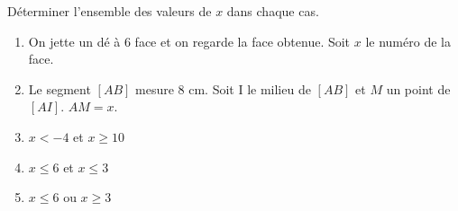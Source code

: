 
Déterminer l'ensemble des valeurs de $x$ dans chaque cas.
\begin{enumerate}
\item On jette un dé à 6 face et on regarde la face obtenue. Soit $x$ le numéro de la face. 
\item Le segment $[AB]$ mesure 8 cm. Soit I le milieu de $[AB]$ et $M$ un point de $[AI]$. $AM = x$. 
\item $x < -4$ et $x \geq 10$
\item $x \leq 6$ et $x \leq 3$
\item $x \leq 6$ ou $x \geq 3$
\end{enumerate}